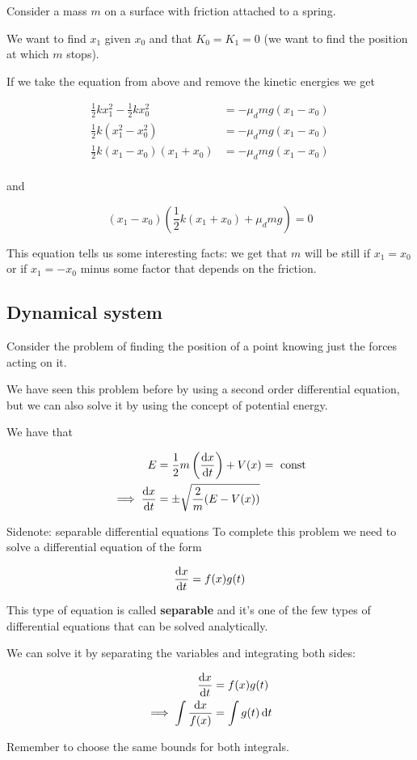 \documentclass[10pt]{extarticle}
\begin{document}
Consider a mass $m$ on a surface with friction attached to a spring.

We want to find $x_1$ given $x_0$ and that $K_0 = K_1 = 0$ (we want to find the position at which $m$ stops).

If we take the equation from above and remove the kinetic energies we get

\begin{align*}
    \frac{1}{2} k x_1^2 - \frac{1}{2} k x_0^2 & = - \mu_d m g (x_1 - x_0) \\
    \frac{1}{2} k (x_1^2 - x_0^2)             & = - \mu_d m g (x_1 - x_0) \\
    \frac{1}{2} k (x_1 - x_0)(x_1 + x_0)      & = - \mu_d m g (x_1 - x_0) \\
\end{align*}

and

$$
    (x_1 - x_0) \left( \frac{1}{2} k (x_1 + x_0) + \mu_d m g \right) = 0
$$

This equation tells us some interesting facts:
we get that $m$ will be still if $x_1 = x_0$ or if $x_1 = -x_0$ minus some factor that depends on the friction.

\subsection{Dynamical system}

Consider the problem of finding the position of a point knowing just the forces acting on it.

We have seen this problem before by using a second order differential equation, but we can also solve it by using the concept of potential energy.

We have that

\begin{align*}
    E                  & = \frac{1}{2} m \left( \dv{x}{t} \right) + V(x) = \text{ const} \\
    \implies \dv{x}{t} & = \pm \sqrt{\frac{2}{m} (E - V(x))}
\end{align*}

\begin{bluebox}{Sidenote: separable differential equations}
    To complete this problem we need to solve a differential equation of the form

    $$
        \dv{x}{t} = f(x) g(t)
    $$

    This type of equation is called \textbf{separable} and it's one of the few types of differential equations that can be solved analytically.

    We can solve it by separating the variables and integrating both sides:

    \begin{align*}
        \dv{x}{t}                         & = f(x) g(t)        \\
        \implies \int \frac{\dd{x}}{f(x)} & = \int g(t) \dd{t}
    \end{align*}

    Remember to choose the same bounds for both integrals.
\end{bluebox}
\end{document}
